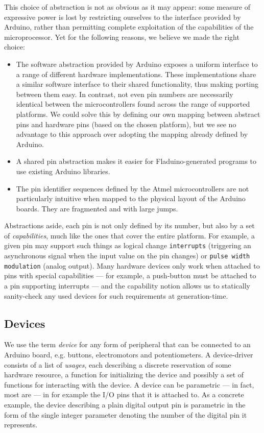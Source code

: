 \documentclass[a4paper, oneside, final]{memoir}
\begin{document}
This choice of abstraction is not as obvious as it may appear: some
measure of expressive power is lost by restricting ourselves to the
interface provided by Arduino, rather than permitting complete
exploitation of the capabilities of the microprocessor.  Yet for the
following reasons, we believe we made the right choice:

\begin{itemize}
\item The software abstraction provided by Arduino exposes a uniform
  interface to a range of different hardware implementations.  These
  implementations share a similar software interface to their shared
  functionality, thus making porting between them easy.  In contrast,
  not even pin numbers are necessarily identical between the
  microcontrollers found across the range of supported platforms.  We
  could solve this by defining our own mapping between abstract pins
  and hardware pins (based on the chosen platform), but we see no
  advantage to this approach over adopting the mapping already defined
  by Arduino.
\item A shared pin abstraction makes it easier for Fladuino-generated
  programs to use existing Arduino libraries.
\item The pin identifier sequences defined by the Atmel
  microcontrollers are not particularly intuitive when mapped to the
  physical layout of the Arduino boards.  They are fragmented and with
  large jumps.
\end{itemize}

Abstractions aside, each pin is not only defined by its number, but
also by a set of \textit{capabilities}, much like the ones that cover
the entire platform.  For example, a given pin may support such things
as logical change \texttt{interrupts} (triggering an asynchronous signal
when the input value on the pin changes) or \texttt{pulse width
  modulation} (analog output).  Many hardware devices only work when
attached to pins with special capabilities --- for example, a
push-button must be attached to a pin supporting interrupts --- and
the capability notion allows us to statically sanity-check any used
devices for such requirements at generation-time.

\subsection{Devices}
\label{sec:devices}
We use the term \textit{device} for any form of peripheral that can be
connected to an Arduino board, e.g. buttons, electromotors and
potentiometers.  A device-driver consists of a list of
\textit{usages}, each describing a discrete reservation of some
hardware resource, a function for initializing the device and possibly
a set of functions for interacting with the device.  A device can be
parametric --- in fact, most are --- in for example the I/O pins that
it is attached to.  As a concrete example, the device describing a
plain digital output pin is parametric in the form of the single
integer parameter denoting the number of the digital pin it
represents.
\end{document}
